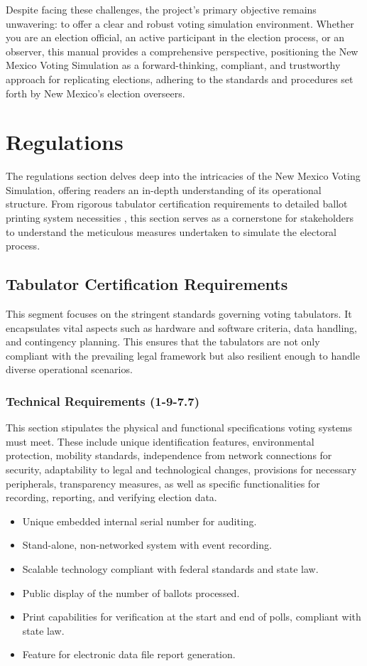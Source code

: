 \documentclass{article}
\begin{document}
Despite facing these challenges, the project's primary objective remains unwavering: to offer a clear and robust voting simulation environment. Whether you are an election official, an active participant in the election process, or an observer, this manual provides a comprehensive perspective, positioning the New Mexico Voting Simulation as a forward-thinking, compliant, and trustworthy approach for replicating elections, adhering to the standards and procedures set forth by New Mexico's election overseers.

\section{Regulations}
The regulations section delves deep into the intricacies of the New Mexico Voting Simulation, offering readers an in-depth understanding of its operational structure. From rigorous tabulator certification requirements to detailed ballot printing system necessities \cite{nmVotingSystem}, this section serves as a cornerstone for stakeholders to understand the meticulous measures undertaken to simulate the electoral process.

\subsection{Tabulator Certification Requirements}
This segment focuses on the stringent standards governing voting tabulators. It encapsulates vital aspects such as hardware and software criteria, data handling, and contingency planning. This ensures that the tabulators are not only compliant with the prevailing legal framework but also resilient enough to handle diverse operational scenarios.

\subsubsection{Technical Requirements (1-9-7.7)}
This section stipulates the physical and functional specifications voting systems must meet. These include unique identification features, environmental protection, mobility standards, independence from network connections for security, adaptability to legal and technological changes, provisions for necessary peripherals, transparency measures, as well as specific functionalities for recording, reporting, and verifying election data.

\begin{itemize}
    \item Unique embedded internal serial number for auditing.
    \item Stand-alone, non-networked system with event recording.
    \item Scalable technology compliant with federal standards and state law.
    \item Public display of the number of ballots processed.
    \item Print capabilities for verification at the start and end of polls, compliant with state law.
    \item Feature for electronic data file report generation.
\end{itemize}
\end{document}
